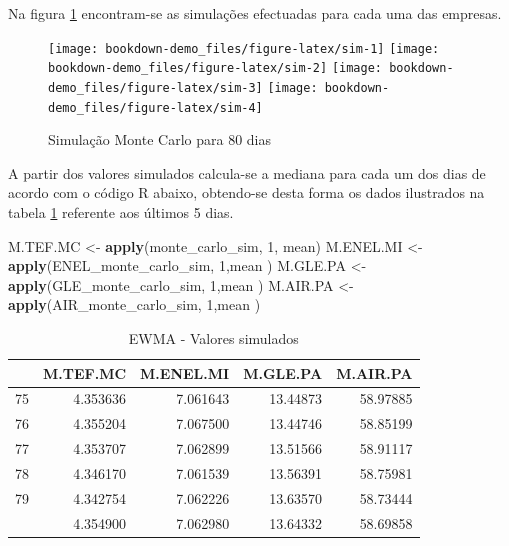 \documentclass[
  12pt,
  a4paper,
  openany]{book}
\newenvironment{Shaded}{\begin{snugshade}}{\end{snugshade}}
\newcommand{\DecValTok}[1]{\textcolor[rgb]{0.00,0.00,0.81}{#1}}
\newcommand{\KeywordTok}[1]{\textcolor[rgb]{0.13,0.29,0.53}{\textbf{#1}}}
\newcommand{\NormalTok}[1]{#1}
\newcommand{\StringTok}[1]{\textcolor[rgb]{0.31,0.60,0.02}{#1}}
\begin{document}
\normalsize

Na figura \ref{fig:sim} encontram-se as simulações efectuadas para cada uma das empresas.

\begin{figure}

{\centering \texttt{[image: bookdown-demo\_files/figure-latex/sim-1]} \texttt{[image: bookdown-demo\_files/figure-latex/sim-2]} \texttt{[image: bookdown-demo\_files/figure-latex/sim-3]} \texttt{[image: bookdown-demo\_files/figure-latex/sim-4]} 

}

\caption{Simulação Monte Carlo para 80 dias}\label{fig:sim}
\end{figure}

A partir dos valores simulados calcula-se a mediana para cada um dos dias de acordo com o código R abaixo, obtendo-se desta forma os dados ilustrados na tabela \ref{tab:simtabewma} referente aos últimos 5 dias.

\scriptsize

\begin{Shaded}
\begin{Highlighting}[]
\NormalTok{M.TEF.MC \textless{}{-}}\StringTok{ }\KeywordTok{apply}\NormalTok{(monte\_carlo\_sim, }\DecValTok{1}\NormalTok{, mean)}
\NormalTok{M.ENEL.MI \textless{}{-}}\StringTok{ }\KeywordTok{apply}\NormalTok{(ENEL\_monte\_carlo\_sim, }\DecValTok{1}\NormalTok{,mean )}
\NormalTok{M.GLE.PA \textless{}{-}}\StringTok{ }\KeywordTok{apply}\NormalTok{(GLE\_monte\_carlo\_sim, }\DecValTok{1}\NormalTok{,mean )}
\NormalTok{M.AIR.PA \textless{}{-}}\StringTok{ }\KeywordTok{apply}\NormalTok{(AIR\_monte\_carlo\_sim, }\DecValTok{1}\NormalTok{,mean )}
\end{Highlighting}
\end{Shaded}

\normalsize

\begin{table}[!h]

\caption{\label{tab:simtabewma}EWMA - Valores simulados}
\centering
\begin{tabular}[t]{lrrrr}
\toprule
  & M.TEF.MC & M.ENEL.MI & M.GLE.PA & M.AIR.PA\\
\midrule
75 & 4.353636 & 7.061643 & 13.44873 & 58.97885\\
76 & 4.355204 & 7.067500 & 13.44746 & 58.85199\\
77 & 4.353707 & 7.062899 & 13.51566 & 58.91117\\
78 & 4.346170 & 7.061539 & 13.56391 & 58.75981\\
79 & 4.342754 & 7.062226 & 13.63570 & 58.73444\\
\addlinespace
80 & 4.354900 & 7.062980 & 13.64332 & 58.69858\\
\bottomrule
\end{tabular}
\end{table}
\FloatBarrier
\centering
\end{document}
